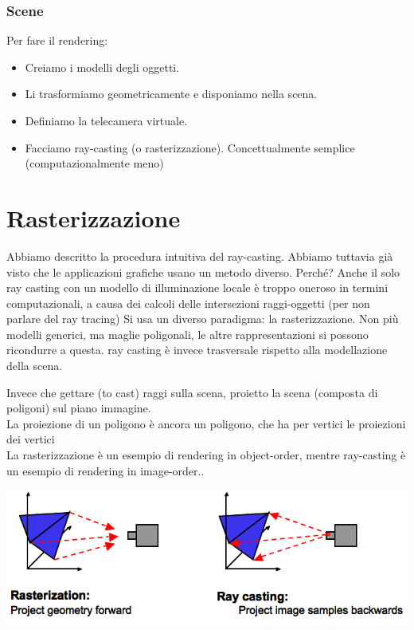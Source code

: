 \documentclass[a4paper, 10pt]{article}
\begin{document}
	\subsubsection{Scene}
	Per fare il rendering:
	\begin{itemize}
		\item Creiamo i modelli degli oggetti.
		\item Li trasformiamo geometricamente e disponiamo nella scena.
		\item Definiamo la telecamera virtuale.
		\item Facciamo ray-casting (o rasterizzazione). Concettualmente semplice (computazionalmente meno)
	\end{itemize}
	
	\section{Rasterizzazione}
	
	Abbiamo descritto la procedura intuitiva del ray-casting. Abbiamo tuttavia già visto che le applicazioni grafiche usano un metodo diverso. Perché?
	Anche il solo ray casting con un modello di illuminazione locale è troppo oneroso in termini computazionali, a causa dei calcoli delle
	intersezioni raggi-oggetti (per non parlare del ray tracing) Si usa un diverso paradigma: la rasterizzazione.
	Non più modelli generici, ma maglie poligonali, le altre rappresentazioni si possono ricondurre a questa.
	ray casting è invece trasversale rispetto alla modellazione della scena.
	
	Invece che gettare (to cast) raggi sulla scena, proietto la scena (composta di poligoni) sul piano immagine.\\
	La proiezione di un poligono è ancora un poligono, che ha per vertici le proiezioni dei vertici\\
	La rasterizzazione è un esempio di rendering in object-order, mentre ray-casting è un esempio di rendering in image-order..
	\begin{center}
		\includegraphics[scale=0.5]{raster}
	\end{center}
	
\end{document}
